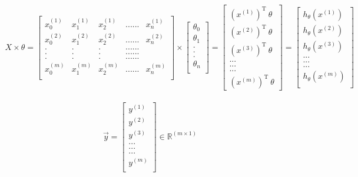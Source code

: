 \documentclass[a4paper,12pt]{report}
\begin{document}
\begin{align*}
			X \times \theta = 
			\begin{bmatrix} 
						x_0 ^{(1)} & x_1 ^{(1)} & x_2 ^{(1)} & ......& x_n ^{(1)} \\
						x_0 ^{(2)} & x_1 ^{(2)} & x_2 ^{(2)} & ......& x_n ^{(2)} \\
						. & . & . & ......&  \\
						. & . & . & ......&  \\
						. & . & . & ......&  \\
						x_0^{(m)} & x_1 ^{(m)} & x_2 ^{(m)} & ......& x_n ^{(m)} \\
			\end{bmatrix} \times
			\begin{bmatrix} 
						\theta_0 \\
						\theta_1 \\
						.  \\
						.  \\
						.  \\
						\theta_n \\
			\end{bmatrix} 
			= \begin{bmatrix} 
				(x^{(1)})^{\mathrm{T}} \ \theta \\
			  (x^{(2)})^{\mathrm{T}} \ \theta \\
			  (x^{(3)})^{\mathrm{T}} \ \theta \\
			  ... \\
			  ... \\
			  ... \\
			  (x^{(m)})^{\mathrm{T}} \ \theta
			\end{bmatrix}	= 
			\begin{bmatrix} 
				h_{\theta}(x^{(1)}) \\
			  h_{\theta}(x^{(2)}) \\
			  h_{\theta}(x^{(3)}) \\
			  ... \\
			  ... \\
			  ... \\
			  h_{\theta}(x^{(m)}) \\
			\end{bmatrix}
\end{align*}

\begin{align*}
\vec{y} = \begin{bmatrix} 
				y^{(1)} \\
			  y^{(2)} \\
			  y^{(3)} \\
			  ... \\
			  ... \\
			  ... \\
			  y^{(m)} \\
			\end{bmatrix}
			\in \mathbb{R}^{(m \times 1)}
\end{align*}
\end{document}
